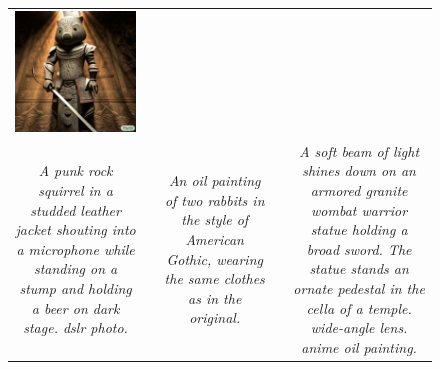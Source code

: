 \begin{figure}[ht!]
\begin{adjustwidth}{-0.8in}{-0.5in}
\begin{tabular}{cccccccccccccccccccc}
\multicolumn{6}{c}{\includegraphics[width=\thirdcolwidth\textwidth]{figures/cherries/wombat_statue.jpg}} \\
\multicolumn{6}{p{\thirdcolwidth\textwidth}}{\textit{\tiny A punk rock squirrel in a studded leather jacket shouting into a microphone while standing on a stump and holding a beer on dark stage. dslr photo.}} &&
\multicolumn{6}{p{\thirdcolwidth\textwidth}}{\textit{\tiny An oil painting of two rabbits in the style of American Gothic, wearing the same clothes as in the original.}} && 
\multicolumn{6}{p{\thirdcolwidth\textwidth}}{\textit{\tiny A soft beam of light shines down on an armored granite wombat warrior statue holding a broad sword. The statue stands an ornate pedestal in the cella of a temple. wide-angle lens. anime oil painting.}} \\


\end{tabular}
\end{adjustwidth}
\end{figure}
